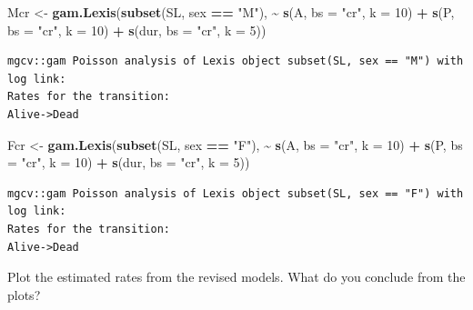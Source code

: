 \documentclass[
]{book}
\newenvironment{Shaded}{\begin{snugshade}}{\end{snugshade}}
\newcommand{\AttributeTok}[1]{\textcolor[rgb]{0.13,0.29,0.53}{#1}}
\newcommand{\DecValTok}[1]{\textcolor[rgb]{0.00,0.00,0.81}{#1}}
\newcommand{\FunctionTok}[1]{\textcolor[rgb]{0.13,0.29,0.53}{\textbf{#1}}}
\newcommand{\NormalTok}[1]{#1}
\newcommand{\OtherTok}[1]{\textcolor[rgb]{0.56,0.35,0.01}{#1}}
\newcommand{\SpecialCharTok}[1]{\textcolor[rgb]{0.81,0.36,0.00}{\textbf{#1}}}
\newcommand{\StringTok}[1]{\textcolor[rgb]{0.31,0.60,0.02}{#1}}
\begin{document}
\begin{enumerate}
\begin{Shaded}
\begin{Highlighting}[]
\NormalTok{Mcr }\OtherTok{\textless{}{-}} \FunctionTok{gam.Lexis}\NormalTok{(}\FunctionTok{subset}\NormalTok{(SL, sex }\SpecialCharTok{==} \StringTok{"M"}\NormalTok{),}
                 \SpecialCharTok{\textasciitilde{}} \FunctionTok{s}\NormalTok{(A, }\AttributeTok{bs =} \StringTok{"cr"}\NormalTok{, }\AttributeTok{k =} \DecValTok{10}\NormalTok{) }\SpecialCharTok{+}
                   \FunctionTok{s}\NormalTok{(P, }\AttributeTok{bs =} \StringTok{"cr"}\NormalTok{, }\AttributeTok{k =} \DecValTok{10}\NormalTok{) }\SpecialCharTok{+}
                 \FunctionTok{s}\NormalTok{(dur, }\AttributeTok{bs =} \StringTok{"cr"}\NormalTok{, }\AttributeTok{k =} \DecValTok{5}\NormalTok{))}
\end{Highlighting}
\end{Shaded}

\begin{verbatim}
mgcv::gam Poisson analysis of Lexis object subset(SL, sex == "M") with log link:
Rates for the transition:
Alive->Dead
\end{verbatim}

\begin{Shaded}
\begin{Highlighting}[]
\NormalTok{Fcr }\OtherTok{\textless{}{-}} \FunctionTok{gam.Lexis}\NormalTok{(}\FunctionTok{subset}\NormalTok{(SL, sex }\SpecialCharTok{==} \StringTok{"F"}\NormalTok{),}
                 \SpecialCharTok{\textasciitilde{}} \FunctionTok{s}\NormalTok{(A, }\AttributeTok{bs =} \StringTok{"cr"}\NormalTok{, }\AttributeTok{k =} \DecValTok{10}\NormalTok{) }\SpecialCharTok{+}
                   \FunctionTok{s}\NormalTok{(P, }\AttributeTok{bs =} \StringTok{"cr"}\NormalTok{, }\AttributeTok{k =} \DecValTok{10}\NormalTok{) }\SpecialCharTok{+}
                 \FunctionTok{s}\NormalTok{(dur, }\AttributeTok{bs =} \StringTok{"cr"}\NormalTok{, }\AttributeTok{k =} \DecValTok{5}\NormalTok{))}
\end{Highlighting}
\end{Shaded}

\begin{verbatim}
mgcv::gam Poisson analysis of Lexis object subset(SL, sex == "F") with log link:
Rates for the transition:
Alive->Dead
\end{verbatim}

  Plot the estimated rates from the revised models.
  What do you conclude from the plots?
\end{enumerate}
\end{document}
